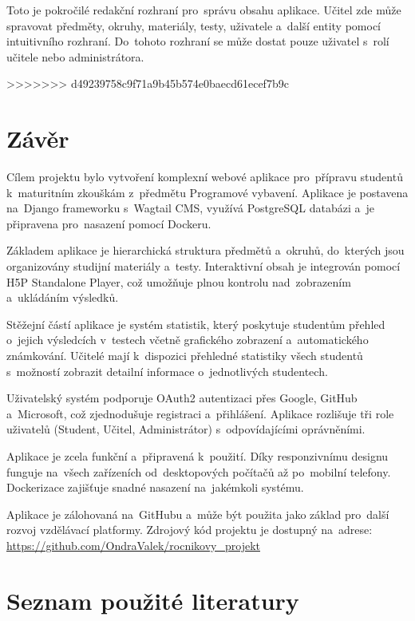 \documentclass[12pt, a4paper,
twoside,
openany
]{report}
\begin{document}
	Toto je pokročilé redakční rozhraní pro~správu obsahu aplikace. Učitel zde může spravovat předměty, okruhy, materiály, testy, uživatele a~další entity pomocí intuitivního rozhraní. Do~tohoto rozhraní se může dostat pouze uživatel s~rolí učitele nebo administrátora.
	
>>>>>>> d49239758c9f71a9b45b574e0baecd61ecef7b9c
	\restoregeometry

	\chapter*{Závěr}
	
	Cílem projektu bylo vytvoření komplexní webové aplikace pro~přípravu studentů k~maturitním zkouškám z~předmětu Programové vybavení. Aplikace je postavena na~Django frameworku s~Wagtail CMS, využívá PostgreSQL databázi a~je připravena pro~nasazení pomocí Dockeru.
	
	Základem aplikace je hierarchická struktura předmětů a~okruhů, do~kterých jsou organizovány studijní materiály a~testy. Interaktivní obsah je integrován pomocí H5P Standalone Player, což umožňuje plnou kontrolu nad~zobrazením a~ukládáním výsledků.
	
	Stěžejní částí aplikace je systém statistik, který poskytuje studentům přehled o~jejich výsledcích v~testech včetně grafického zobrazení a~automatického známkování. Učitelé mají k~dispozici přehledné statistiky všech studentů s~možností zobrazit detailní informace o~jednotlivých studentech.
	
	Uživatelský systém podporuje OAuth2 autentizaci přes Google, GitHub a~Microsoft, což zjednodušuje registraci a~přihlášení. Aplikace rozlišuje tři role uživatelů (Student, Učitel, Administrátor) s~odpovídajícími oprávněními.
	
	Aplikace je zcela funkční a~připravená k~použití. Díky responzivnímu designu funguje na~všech zařízeních od~desktopových počítačů až po~mobilní telefony. Dockerizace zajišťuje snadné nasazení na~jakémkoli systému.
	
	Aplikace je zálohovaná na~GitHubu a~může být použita jako základ pro~další rozvoj vzdělávací platformy. Zdrojový kód projektu je dostupný na~adrese: \url{https://github.com/OndraValek/rocnikovy_projekt}

	\chapter*{Seznam použité literatury}
	
\end{document}

